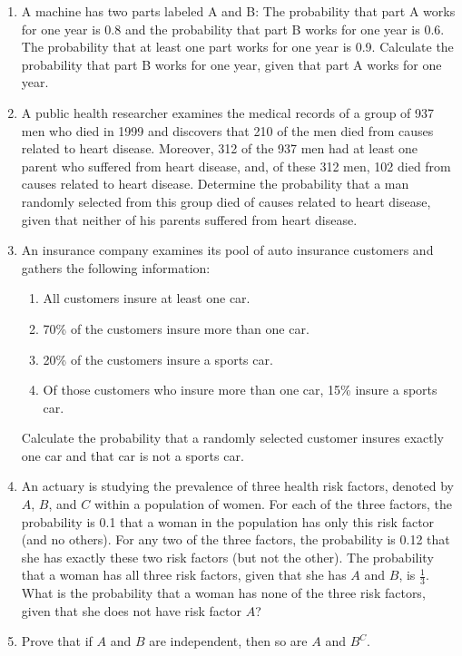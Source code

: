 \documentclass[../main.tex]{subfiles}
\begin{document}
{\begin{enumerate}
	\item A machine has two parts labeled A and B: The probability that part A works
	for one year is 0.8 and the probability that part B works for one year is 0.6.
	The probability that at least one part works for one year is 0.9.
	Calculate the probability that part B works for one year, given that part A
	works for one year.
	
	\item A public health researcher examines the medical records of a group of 937
	men who died in 1999 and discovers that 210 of the men died from causes
	related to heart disease. Moreover, 312 of the 937 men had at least one
	parent who suffered from heart disease, and, of these 312 men, 102 died from
	causes related to heart disease.
	Determine the probability that a man randomly selected from this group died
	of causes related to heart disease, given that neither of his parents suffered
	from heart disease.
	
	\item An insurance company examines its pool of auto insurance customers and
	gathers the following information:
	\begin{enumerate}
		\item All customers insure at least one car.
		\item  70\% of the customers insure more than one car.
		\item  20\% of the customers insure a sports car.
		\item Of those customers who insure more than one car, 15\% insure a sports car.
	\end{enumerate}
	Calculate the probability that a randomly selected customer insures exactly
	one car and that car is not a sports car.


	\item An actuary is studying the prevalence of three health risk factors, denoted
	by $A$, $B$, and $C$ within a population of women. For each of the three factors,
	the probability is 0.1 that a woman in the population has only this risk factor
	(and no others). For any two of the three factors, the probability is 0.12 that
	she has exactly these two risk factors (but not the other). The probability
	that a woman has all three risk factors, given that she has $A$ and $B$, is 
	$\frac13$.
	What is the probability that a woman has none of the three risk factors,
	given that she does not have risk factor $A$?
	
	\item Prove that if $A$ and $B$ are independent, then so are $A$ and $B^C$.
	

\end{enumerate}}
\end{document}
